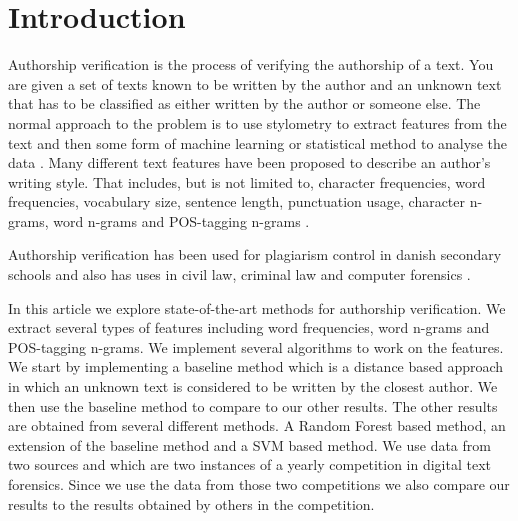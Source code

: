\section{Introduction} \label{sec:introduction}
Authorship verification is the process of verifying the authorship of a text.
You are given a set of texts known to be written by the author and an unknown
text that has to be classified as either written by the author or someone else.
The normal approach to the problem is to use stylometry to extract features from
the text and then some form of machine learning or statistical method to analyse
the data \cite{stamatos2009}. Many different text features have been proposed
to describe an author's writing style. That includes, but is not limited to,
character frequencies, word frequencies, vocabulary size, sentence length,
punctuation usage, character n-grams, word n-grams and \gls{POS}-tagging n-grams
\cite{stamatos2009}.

Authorship verification has been used for plagiarism control in danish secondary
schools \cite{hansen2014} and also has uses in civil law, criminal law and
computer forensics \cite{stamatos2009}.

In this article we explore state-of-the-art methods for authorship verification.
We extract several types of features including word frequencies, word n-grams
and \gls{POS}-tagging n-grams. We implement several algorithms to work on the
features. We start by implementing a baseline method which is a distance based
approach in which an unknown text is considered to be written by the closest
author. We then use the baseline method to compare to our other results. The
other results are obtained from several different methods. A Random Forest based
method, an extension of the baseline method and a \gls{SVM} based method. We
use data from two sources \cite{pan:2015} and \cite{pan:2013} which are two
instances of a yearly competition in digital text forensics. Since we use the
data from those two competitions we also compare our results to the results
obtained by others in the competition.
